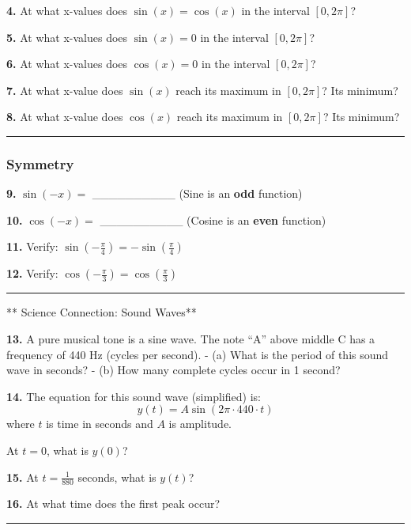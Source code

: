 \documentclass[
  11pt,
]{article}
\begin{document}
\textbf{4.} At what x-values does \(\sin(x) = \cos(x)\) in the interval
\([0, 2\pi]\)?

\textbf{5.} At what x-values does \(\sin(x) = 0\) in the interval
\([0, 2\pi]\)?

\textbf{6.} At what x-values does \(\cos(x) = 0\) in the interval
\([0, 2\pi]\)?

\textbf{7.} At what x-value does \(\sin(x)\) reach its maximum in
\([0, 2\pi]\)? Its minimum?

\textbf{8.} At what x-value does \(\cos(x)\) reach its maximum in
\([0, 2\pi]\)? Its minimum?

\begin{center}\rule{0.5\linewidth}{0.5pt}\end{center}

\hypertarget{symmetry}{%
\subsubsection{Symmetry}\label{symmetry}}

\textbf{9.} \(\sin(-x) ={}\) \_\_\_\_\_\_\_\_\_\_ (Sine is an
\textbf{odd} function)

\textbf{10.} \(\cos(-x) ={}\) \_\_\_\_\_\_\_\_\_\_ (Cosine is an
\textbf{even} function)

\textbf{11.} Verify: \(\sin(-\frac{\pi}{4}) = -\sin(\frac{\pi}{4})\)

\textbf{12.} Verify: \(\cos(-\frac{\pi}{3}) = \cos(\frac{\pi}{3})\)

\begin{center}\rule{0.5\linewidth}{0.5pt}\end{center}

** Science Connection: Sound Waves**

\textbf{13.} A pure musical tone is a sine wave. The note ``A'' above
middle C has a frequency of 440 Hz (cycles per second). - (a) What is
the period of this sound wave in seconds? - (b) How many complete cycles
occur in 1 second?

\textbf{14.} The equation for this sound wave (simplified) is:
\[y(t) = A\sin(2\pi \cdot 440 \cdot t)\] where \(t\) is time in seconds
and \(A\) is amplitude.

At \(t = 0\), what is \(y(0)\)?

\textbf{15.} At \(t = \frac{1}{880}\) seconds, what is \(y(t)\)?

\textbf{16.} At what time does the first peak occur?

\begin{center}\rule{0.5\linewidth}{0.5pt}\end{center}
\end{document}
